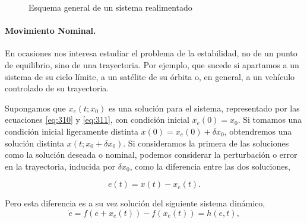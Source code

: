 \begin{figure}
\centering
{}

\caption{Esquema general de un sistema realimentado}\label{fig:rea}
\end{figure}

\paragraph{Movimiento Nominal.} En ocasiones nos interesa estudiar el problema de la estabilidad, no de un punto de equilibrio, sino de una trayectoria. Por ejemplo, que sucede si apartamos a un sistema de su ciclo límite, a un satélite de su órbita o, en general, a un vehículo controlado de su trayectoria. 

Supongamos que $x_e(t;x_0)$ es una solución para el sistema, representado por las ecuaciones \ref{eq:310} y \ref{eq:311}, con condición inicial $x_e(0) = x_0$. Si tomamos una condición inicial ligeramente distinta $x(0) = x_e(0) + \delta x_0$, obtendremos una solución distinta $x(t;x_0+\delta x_0)$. Si consideramos la primera de las soluciones como la solución deseada o nominal, podemos considerar la perturbación o error en la trayectoria, inducida por $\delta x_0$, como la diferencia entre las dos soluciones,

\begin{equation}
e(t) = x(t) - x_e(t).
\end{equation}

Pero esta diferencia es a su vez solución del siguiente sistema dinámico,
\begin{equation} \label{eq:315}
\dot{e} = f(e + x_e(t)) - f(x_e(t)) = h(e,t),
\end{equation}

